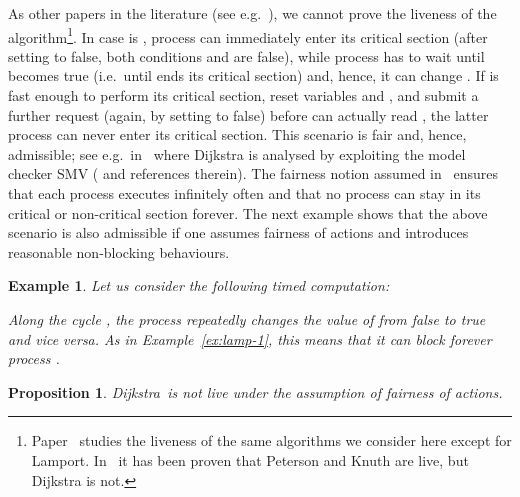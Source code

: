\documentclass[copyright,creativecommons]{eptcs}
\newenvironment{tracex}{\ccspace{0.15}\noindent}{\ccspace{0.2}}
\newcommand{\ccspace}[1]{\vspace{#1cm}}
\newtheorem{proposition}[theorem]{Proposition}
\newtheorem{example}[theorem]{Example}
\newcommand{\dijkstra}{{\it Dijkstra}}
\newcommand{\dijkstraa}{{\sf Dijkstra}} \newcommand{\dijkstrab}{\dijkstra}
\begin{document}
As other papers in the literature (see e.g.~\cite{Bogunovic03}), we cannot
prove the liveness of the algorithm\footnote{Paper~\cite{Bogunovic03}
studies the liveness of the same algorithms we consider here except for
Lamport. In~\cite{Bogunovic03} it has been proven that Peterson and Knuth
are live, but Dijkstra is not.}. 
In case  is  , process  can immediately enter its critical
section (after setting  to false, both conditions  and
 are false), while process  has to wait until 
becomes true (i.e.\ until  ends its critical section) and, hence,
it can change . If  is fast enough to perform its critical
section, reset variables  and , and submit a further request
(again, by setting  to false) before  can actually read
, the latter process can never enter its critical section. This
scenario is fair and, hence, admissible; see e.g.\ in~\cite{Bogunovic03}
where Dijkstra is analysed by exploiting the model checker SMV
(\cite{Bogunovic03} and references therein). The fairness notion assumed
in~\cite{Bogunovic03} ensures that each process executes infinitely often
and that no process can stay in its critical or non-critical section
forever. The next example shows that the above scenario is also admissible
if one assumes fairness of actions and introduces reasonable non-blocking
behaviours.
\begin{example}\rm\label{ex:dijkstra1}
Let us consider the following timed computation:

\begin{tracex}

\end{tracex}

Along the cycle , the process  repeatedly
changes the value of   from {\em false} to {\em true} and vice versa.
As in Example~\ref{ex:lamp-1}, this means that it can block forever process
.
\end{example}

\begin{proposition}\label{prop:dijkstra} 
\dijkstraa\ is not live under the assumption of fairness of actions.
\end{proposition}
\end{document}

